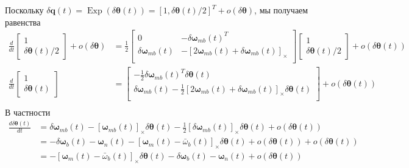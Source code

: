 \documentclass[12pt]{article}
\begin{document}
Поскольку $\delta\pmb{q}(t)=\operatorname{Exp}(\delta\pmb{\theta}(t))=[1, \delta\pmb{\theta}(t)/2]^T+o(\delta\pmb{\theta})$,
мы получаем равенства
\begin{equation}
    \begin{aligned}
        \frac{d}{d t}\begin{bmatrix}1 \\ \delta\pmb{\theta}(t)/2\end{bmatrix}+o(\delta\pmb{\theta})
         & =
        \frac{1}{2}\begin{bmatrix}
            0                          & -\delta\pmb{\omega}_{mb}(t)^T                              \\
            \delta\pmb{\omega}_{mb}(t) & -[2\pmb{\omega}_{mb}(t)+\delta\pmb{\omega}_{mb}(t)]_\times \\
        \end{bmatrix}
        \begin{bmatrix}1 \\ \delta\pmb{\theta}(t)/2\end{bmatrix} + o(\delta\pmb{\theta}(t)) \\
        \frac{d}{d t}\begin{bmatrix}1 \\ \delta\pmb{\theta}(t)\end{bmatrix}
         & =
        \begin{bmatrix}
            -\frac{1}{2}\delta\pmb{\omega}_{mb}(t)^T \delta\pmb{\theta}(t)                                                        \\
            \delta\pmb{\omega}_{mb}(t)-\frac{1}{2}[2\pmb{\omega}_{mb}(t)+\delta\pmb{\omega}_{mb}(t)]_\times \delta\pmb{\theta}(t) \\
        \end{bmatrix}
        + o(\delta\pmb{\theta}(t))                            \\
    \end{aligned}
\end{equation}
В частности
\begin{equation}
    \begin{aligned}
        \frac{d\delta\pmb{\theta}(t)}{dt}
         & =\delta\pmb{\omega}_{mb}(t)
        - [\pmb{\omega}_{mb}(t)]_\times\delta\pmb{\theta}(t)
        - \frac{1}{2}[\delta\pmb{\omega}_{mb}(t)]_\times \delta\pmb{\theta}(t)
        + o(\delta\pmb{\theta}(t))                                                 \\
         & = - \delta\pmb{\omega}_{b}(t) - \pmb{\omega}_n(t)
        - [\pmb{\omega}_{m}(t)-\bar{\omega}_b(t)]_\times\delta\pmb{\theta}(t)
        + o(\delta\pmb{\theta}(t))
        + o(\delta\pmb{\theta}(t))                                                 \\
         & = - [\pmb{\omega}_{m}(t)-\bar{\omega}_b(t)]_\times\delta\pmb{\theta}(t)
        - \delta\pmb{\omega}_{b}(t) - \pmb{\omega}_n(t)
        + o(\delta\pmb{\theta}(t))
    \end{aligned}
\end{equation}
\end{document}
